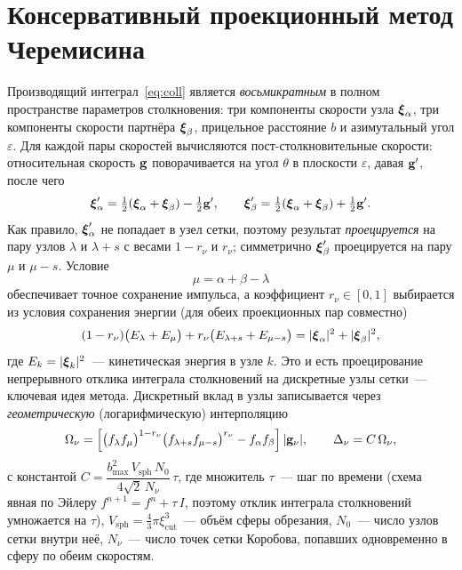 \section{Консервативный проекционный метод Черемисина}

Производящий интеграл~\eqref{eq:coll} является \emph{восьмикратным} в полном пространстве параметров столкновения: три
компоненты скорости узла $\boldsymbol{\xi}_\alpha$, три компоненты скорости партнёра $\boldsymbol{\xi}_\beta$, прицельное расстояние $b$ и
азимутальный угол $\varepsilon$.
Для каждой пары скоростей вычисляются пост-столкновительные скорости: относительная скорость $\mathbf{g}$ поворачивается на
угол $\theta$ в плоскости $\varepsilon$, давая $\mathbf{g}'$, после чего
\begin{equation}
  \boldsymbol{\xi}'_\alpha=\tfrac12(\boldsymbol{\xi}_\alpha+\boldsymbol{\xi}_\beta)-\tfrac12\mathbf{g}',\qquad
  \boldsymbol{\xi}'_\beta=\tfrac12(\boldsymbol{\xi}_\alpha+\boldsymbol{\xi}_\beta)+\tfrac12\mathbf{g}'.
\end{equation}
Как правило, $\boldsymbol{\xi}'_\alpha$ не попадает в узел сетки, поэтому результат \emph{проецируется} на пару узлов $\lambda$ и
$\lambda+s$ с весами $1-r_\nu$ и $r_\nu$; симметрично $\boldsymbol{\xi}'_\beta$ проецируется на пару $\mu$ и $\mu-s$.
Условие
\begin{equation}
  \mu=\alpha+\beta-\lambda
\end{equation}
обеспечивает точное сохранение импульса, а коэффициент $r_\nu\in[0,1]$ выбирается из условия сохранения энергии (для
обеих проекционных пар совместно)
\begin{equation}
  (1-r_{\nu})\big(E_{\lambda}+E_{\mu}\big)+r_\nu\big(E_{\lambda+s}+E_{\mu-s}\big)=|\boldsymbol{\xi}_\alpha|^2+|\boldsymbol{\xi}_\beta|^2,
\end{equation}
где $E_k=|\boldsymbol{\xi}_k|^2$~--- кинетическая энергия в узле $k$.
Это и есть проецирование непрерывного отклика интеграла столкновений на дискретные узлы сетки~--- ключевая идея метода.
Дискретный вклад в узлы записывается через \emph{геометрическую} (логарифмическую) интерполяцию
\begin{equation}
  \Omega_\nu=\Big[\big(f_\lambda f_\mu\big)^{1-r_\nu}\big(f_{\lambda+s}f_{\mu-s}\big)^{r_\nu}
              -f_\alpha f_\beta\Big]\,|\mathbf{g}_\nu|,\qquad \Delta_\nu=C\,\Omega_\nu,
  \label{eq:omega}
\end{equation}
с константой $C=\dfrac{b_{\max}^2\,V_{\mathrm{sph}}\,N_0}{4\sqrt{2}\,N_\nu}\,\tau$, где множитель $\tau$~--- шаг по
времени (схема явная по Эйлеру $f^{n+1}=f^n+\tau\,I$, поэтому отклик интеграла столкновений умножается на $\tau$),
$V_{\mathrm{sph}}=\tfrac43\pi\xi_{\mathrm{cut}}^3$~--- объём сферы обрезания, $N_0$~--- число узлов сетки внутри неё,
$N_\nu$~--- число точек сетки Коробова, попавших одновременно в сферу по обеим скоростям.

